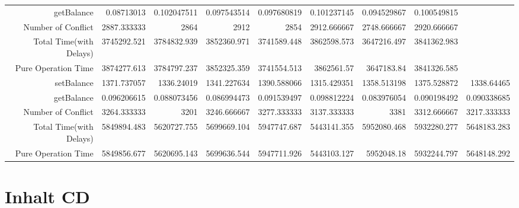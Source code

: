 \begin{landscape}
\begin{table}[htbp]
\begin{tabular}{rrrrrrrrr}
    getBalance & 0.08713013 & 0.102047511 & 0.097543514 & 0.097680819 & 0.101237145 & 0.094529867 & 0.100549815 &  \\
    Number of Conflict & 2887.333333 & 2864  & 2912  & 2854  & 2912.666667 & 2748.666667 & 2920.666667 &  \\
    Total Time(with Delays) & 3745292.521 & 3784832.939 & 3852360.971 & 3741589.448 & 3862598.573 & 3647216.497 & 3841362.983 &  \\
    Pure Operation Time & 3874277.613 & 3784797.237 & 3852325.359 & 3741554.513 & 3862561.57 & 3647183.84 & 3841326.585 &  \\
\cline{1-9}     
    setBalance & 1371.737057 & 1336.24019 & 1341.227634 & 1390.588066 & 1315.429351 & 1358.513198 & 1375.528872 & 1338.64465 \\
    getBalance & 0.096206615 & 0.088073456 & 0.086994473 & 0.091539497 & 0.098812224 & 0.083976054 & 0.090198492 & 0.090338685 \\
    Number of Conflict & 3264.333333 & 3201  & 3246.666667 & 3277.333333 & 3137.333333 & 3381  & 3312.666667 & 3217.333333 \\
    Total Time(with Delays) & 5849894.483 & 5620727.755 & 5699669.104 & 5947747.687 & 5443141.355 & 5952080.468 & 5932280.277 & 5648183.283 \\
    Pure Operation Time & 5849856.677 & 5620695.143 & 5699636.544 & 5947711.926 & 5443103.127 & 5952048.18 & 5932244.797 & 5648148.292 \\
    \bottomrule
    \end{tabular}%
  \label{tab:increment Cache}%
\end{table}%
\end{landscape}

\section{Inhalt CD}
\label{sec:inhalt-cd}

